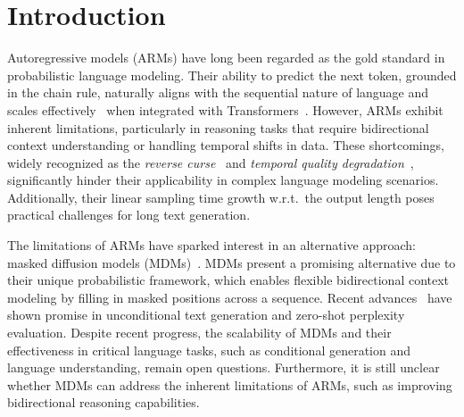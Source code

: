 \documentclass{article} %
\begin{document}
\section{Introduction}
 
Autoregressive models (ARMs) have long been regarded as the gold standard in probabilistic language modeling. Their ability to predict the next token, grounded in the chain rule, naturally aligns with the sequential nature of language and scales effectively~\citep{radford2018improving, radford2019language, brown2020language, chatgpt, achiam2023gpt,touvron2023llama, touvron2023llama2, dubey2024llama} when integrated with Transformers~\citep{vaswani2017attention}. However, ARMs exhibit inherent limitations, particularly in reasoning tasks that require bidirectional context understanding or handling temporal shifts in data. These shortcomings, widely recognized as the \emph{reverse curse}~\citep{berglund2023reversal} and \emph{temporal quality degradation}~\citep{vela2022temporal}, significantly hinder their applicability in complex language modeling scenarios. Additionally, their linear sampling time growth w.r.t.\ the output length poses practical challenges for long text generation.

The limitations of ARMs have sparked interest in an alternative approach: masked diffusion models (MDMs)~\citep{austin2021structured,hoogeboom2021argmax,hoogeboom2021autoregressive,he2022diffusionbert,campbell2022continuous, meng2022concrete,sun2022score,lou2023discrete,sahoo2024simple, shi2024simplified, ou2024your}. MDMs present a promising alternative due to their unique probabilistic framework, which enables flexible bidirectional context modeling by filling in masked positions across a sequence. Recent advances~\citep{lou2023discrete, sahoo2024simple, shi2024simplified, ou2024your} have shown promise in unconditional text generation and zero-shot perplexity evaluation.  Despite recent progress, the scalability of MDMs and their effectiveness in critical language tasks, such as conditional generation and language understanding, remain open questions. Furthermore, it is still unclear whether MDMs can address the inherent limitations of ARMs, such as improving bidirectional reasoning capabilities.
\end{document}
